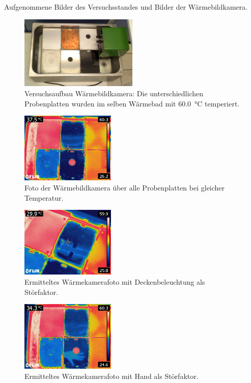 Aufgenommene Bilder des Versuchsstandes und Bilder der Wärmebildkamera. 

\begin{figure}[H]
		\centering
		\includegraphics[width=0.5\textwidth]{../FLIR_100/FLIR2240.jpg}
		\caption{Versuchsaufbau Wärmebildkamera: Die unterschiedlichen Probenplatten wurden im selben Wärmebad mit \SI{60,0}{\celsius} temperiert.}
		\label{fig:VersuchsaufbauWBK}
\end{figure}

\begin{figure}[H]
		\centering
		\includegraphics[width=0.4\textwidth]{../FLIR_100/FLIR2241.jpg}
		\caption{Foto der Wärmebildkamera über alle Probenplatten bei gleicher Temperatur.}
		\label{fig:FotoWBK}
\end{figure}

\begin{figure}[H]
		\centering
		\includegraphics[width=0.4\textwidth]{../FLIR_100/FLIR2249.jpg}
		\caption[Ermitteltes Wärmekamerafoto mit Deckenbeleuchtung als Störfaktor]{Ermitteltes Wärmekamerafoto mit Deckenbeleuchtung als Störfaktor.}
		\label{fig:WBKHand}
\end{figure}

\begin{figure}[H]
		\centering
		\includegraphics[width=0.4\textwidth]{../FLIR_100/FLIR2243.jpg}
		\caption[Ermitteltes Wärmekamerafoto mit Hand als Störfaktor]{Ermitteltes Wärmekamerafoto mit Hand als Störfaktor.}
		\label{fig:WBKDecke}
\end{figure}
